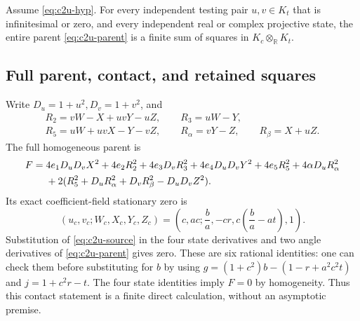 \begin{theorem}
\label{thm:c2u}
Assume \eqref{eq:c2u-hyp}.  For every independent testing pair
$u,v\in K_t$ that is infinitesimal or zero, and every independent real
or complex projective state, the entire parent
\eqref{eq:c2u-parent} is a finite sum of squares in
$K_c\otimes_{\mathbb R}K_t$.
\end{theorem}

\subsection{Full parent, contact, and retained squares}
Write $D_u=1+u^2,D_v=1+v^2$, and
\[
\begin{gathered}
R_2=vW-X+uvY-uZ,\qquad R_3=uW-Y,\\
R_5=uW+uvX-Y-vZ,\qquad R_\alpha=vY-Z,\qquad R_\beta=X+uZ.
\end{gathered}
\]
The full homogeneous parent is
\begin{align}
F={}&4e_1D_uD_vX^2+4e_2R_2^2+4e_3D_vR_3^2
 +4e_4D_uD_vY^2+4e_5R_5^2+4\alpha D_uR_\alpha^2\notag\\
 &+2(R_5^2+D_uR_\alpha^2+D_vR_\beta^2-D_uD_vZ^2).
\label{eq:c2u-parent}
\end{align}
Its exact coefficient-field stationary zero is
\begin{equation}
(u_c,v_c;W_c,X_c,Y_c,Z_c)
=\left(c,ac;\frac ba,-cr,c\left(\frac ba-at\right),1\right).
\label{eq:c2u-contact}
\end{equation}
Substitution of \eqref{eq:c2u-source} in the four state derivatives and
two angle derivatives of \eqref{eq:c2u-parent} gives zero. These are six
rational identities: one can check them before substituting for $b$ by
using $g=(1+c^2)b-(1-r+a^2c^2t)$ and $j=1+c^2r-t$.
The four state identities imply $F=0$ by homogeneity. Thus this contact
statement is a finite direct calculation, without an asymptotic premise.

